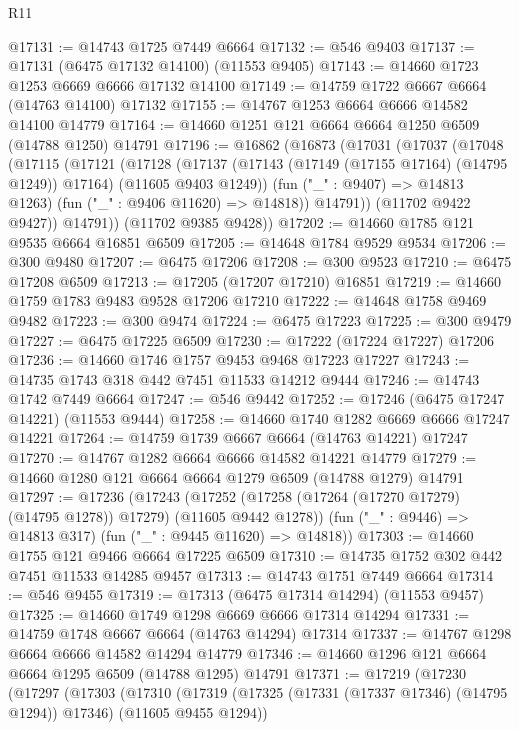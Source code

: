 \begin{lexlean}{R11}
\begin{coremodule}
@17131 := @14743 @1725 @7449 @6664
@17132 := @546 @9403
@17137 := @17131 (@6475 @17132 @14100) (@11553 @9405)
@17143 := @14660 @1723 @1253 @6669 @6666 @17132 @14100
@17149 := @14759 @1722 @6667 @6664 (@14763 @14100) @17132
@17155 := @14767 @1253 @6664 @6666 @14582 @14100 @14779
@17164 := @14660 @1251 @121 @6664 @6664 @1250 @6509 (@14788 @1250) @14791
@17196 := @16862
    (@16873
      (@17031
        (@17037
          (@17048
            (@17115
              (@17121
                (@17128
                  (@17137
                    (@17143 (@17149 (@17155 @17164) (@14795 @1249)) @17164)
                    (@11605 @9403 @1249))
                  (fun ("_" : @9407) => @14813 @1263)
                  (fun ("_" : @9406 @11620) => @14818))
                @14791))
            (@11702 @9422 @9427))
          @14791))
      (@11702 @9385 @9428))
@17202 := @14660 @1785 @121 @9535 @6664 @16851 @6509
@17205 := @14648 @1784 @9529 @9534
@17206 := @300 @9480
@17207 := @6475 @17206
@17208 := @300 @9523
@17210 := @6475 @17208 @6509
@17213 := @17205 (@17207 @17210) @16851
@17219 := @14660 @1759 @1783 @9483 @9528 @17206 @17210
@17222 := @14648 @1758 @9469 @9482
@17223 := @300 @9474
@17224 := @6475 @17223
@17225 := @300 @9479
@17227 := @6475 @17225 @6509
@17230 := @17222 (@17224 @17227) @17206
@17236 := @14660 @1746 @1757 @9453 @9468 @17223 @17227
@17243 := @14735 @1743 @318 @442 @7451 @11533 @14212 @9444
@17246 := @14743 @1742 @7449 @6664
@17247 := @546 @9442
@17252 := @17246 (@6475 @17247 @14221) (@11553 @9444)
@17258 := @14660 @1740 @1282 @6669 @6666 @17247 @14221
@17264 := @14759 @1739 @6667 @6664 (@14763 @14221) @17247
@17270 := @14767 @1282 @6664 @6666 @14582 @14221 @14779
@17279 := @14660 @1280 @121 @6664 @6664 @1279 @6509 (@14788 @1279) @14791
@17297 := @17236
    (@17243
      (@17252 (@17258 (@17264 (@17270 @17279) (@14795 @1278)) @17279) (@11605 @9442 @1278))
      (fun ("_" : @9446) => @14813 @317)
      (fun ("_" : @9445 @11620) => @14818))
@17303 := @14660 @1755 @121 @9466 @6664 @17225 @6509
@17310 := @14735 @1752 @302 @442 @7451 @11533 @14285 @9457
@17313 := @14743 @1751 @7449 @6664
@17314 := @546 @9455
@17319 := @17313 (@6475 @17314 @14294) (@11553 @9457)
@17325 := @14660 @1749 @1298 @6669 @6666 @17314 @14294
@17331 := @14759 @1748 @6667 @6664 (@14763 @14294) @17314
@17337 := @14767 @1298 @6664 @6666 @14582 @14294 @14779
@17346 := @14660 @1296 @121 @6664 @6664 @1295 @6509 (@14788 @1295) @14791
@17371 := @17219
    (@17230
      (@17297
        (@17303
          (@17310
            (@17319 (@17325 (@17331 (@17337 @17346) (@14795 @1294)) @17346) (@11605 @9455 @1294))

\end{coremodule}
\end{lexlean}
